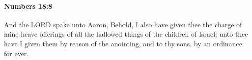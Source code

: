 
		\paragraph{Numbers 18:8} %
			\label{NUMBERS-18-8}

			And the LORD spake unto Aaron, Behold, I also have given thee the charge of mine heave offerings of all the hallowed things of the children of Israel; unto thee have I given them by reason of the anointing, and to thy sons, by an ordinance for ever.


